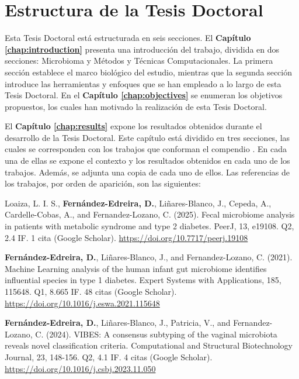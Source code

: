\chapter*{Estructura de la Tesis Doctoral}

Esta Tesis Doctoral está estructurada en seis secciones. El \textbf{Capítulo \ref{chap:introduction}} presenta una introducción del trabajo, dividida en dos secciones: Microbioma y Métodos y Técnicas Computacionales. La primera sección establece el marco biológico del estudio, mientras que la segunda sección introduce las herramientas y enfoques que se han empleado a lo largo de esta Tesis Doctoral. En el \textbf{Capítulo \ref{chap:objectives}} se enumeran los objetivos propuestos, los cuales han motivado la realización de esta Tesis Doctoral.

El \textbf{Capítulo \ref{chap:results}} expone los resultados obtenidos durante el desarrollo de la Tesis Doctoral. Este capítulo está dividido en tres secciones, las cuales se corresponden con los trabajos que conforman el compendio \cite{paper1, paper2, paper3}. En cada una de ellas se expone el contexto y los resultados obtenidos en cada uno de los trabajos. Además, se adjunta una copia de cada uno de ellos. Las referencias de los trabajos, por orden de aparición, son las siguientes:

\begin{my_list_item}
	
    \item Loaiza, L. I. S., \textbf{Fernández-Edreira, D.}, Liñares-Blanco, J., Cepeda, A., Cardelle-Cobas, A., and Fernandez-Lozano, C. (2025). Fecal microbiome analysis in patients with metabolic syndrome and type 2 diabetes. PeerJ, 13, e19108. Q2, 2.4 IF. 1 cita (Google Scholar). \url{https://doi.org/10.7717/peerj.19108}
    
    \item \textbf{Fernández-Edreira, D.}, Liñares-Blanco, J., and Fernandez-Lozano, C. (2021). Machine Learning analysis of the human infant gut microbiome identifies influential species in type 1 diabetes. Expert Systems with Applications, 185, 115648. Q1, 8.665 IF. 48 citas (Google Scholar). \url{https://doi.org/10.1016/j.eswa.2021.115648}
    
    \item \textbf{Fernández-Edreira, D.}, Liñares-Blanco, J., Patricia, V., and Fernandez-Lozano, C. (2024). VIBES: A consensus subtyping of the vaginal microbiota reveals novel classification criteria. Computational and Structural Biotechnology Journal, 23, 148-156. Q2, 4.1 IF. 4 citas (Google Scholar). \url{https://doi.org/10.1016/j.csbj.2023.11.050}
    
\end{my_list_item}

